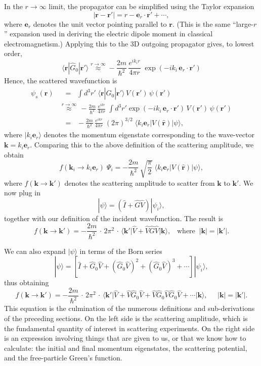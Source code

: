 \documentclass[pra,12pt]{revtex4}
\begin{document}
In the $r\rightarrow\infty$ limit, the propagator can be simplified
using the Taylor expansion
$$|\mathbf{r} - \mathbf{r}'| = r - \mathbf{e}_r \cdot \mathbf{r}' + \cdots,$$
where $\mathbf{e}_r$ denotes the unit vector pointing parallel to
$\mathbf{r}$.  (This is the same ``large-$r$'' expansion used in
deriving the electric dipole moment in classical electromagnetism.)
Applying this to the 3D outgoing propagator gives, to lowest order,
$$\langle\mathbf{r}|\hat{G}_0|\mathbf{r}'\rangle \overset{r\rightarrow\infty}{\approx} - \frac{2m}{\hbar^2}\, \frac{e^{ik_ir}}{4\pi r}\; \exp\left(-ik_i \,\mathbf{e}_r \cdot \mathbf{r}'\right)$$
Hence, the scattered wavefunction is
$$\begin{aligned}\psi_s(\mathbf{r}) &\;\;= \;\; \int d^3r'\; \langle\mathbf{r}|\hat{G}_0|\mathbf{r}'\rangle\, V(\mathbf{r}')\, \psi(\mathbf{r}') \\ &\overset{r\rightarrow\infty}{\approx} \, - \frac{2m}{\hbar^2} \, \frac{e^{ikr}}{4\pi r}\; \int d^3r' \exp\left(-ik_i \,\mathbf{e}_r \cdot \mathbf{r}'\right)\, V(\mathbf{r}')\, \psi(\mathbf{r}') \\ &\;\;=\;\; - \frac{2m}{\hbar^2} \, \frac{e^{ikr}}{4\pi r} \; (2\pi)^{3/2} \; \big\langle k_i \mathbf{e}_r \big|V(\hat{\mathbf{r}})\big|\psi\big\rangle, \end{aligned}$$
where $|k_i\mathbf{e}_r \rangle$ denotes the momentum eigenstate
corresponding to the wave-vector $\mathbf{k} = k_i\mathbf{e}_r$.
Comparing this to the above definition of the scattering amplitude, we
obtain
$$f(\mathbf{k}_i\rightarrow k_i\mathbf{e}_r )\; \Psi_i = - \frac{2m}{\hbar^2} \,\sqrt{\frac{\pi}{2}} \; \big\langle k_i \mathbf{e}_r \big|V(\hat{\mathbf{r}})\big|\psi\big\rangle,$$
where $f(\mathbf{k}\rightarrow \mathbf{k}')$ denotes the scattering
amplitude to scatter from $\mathbf{k}$ to $\mathbf{k}'$.  We now
plug in
$$|\psi\rangle = \left(\hat{I} + \hat{G}\hat{V}\right)|\psi_i\rangle,$$
together with our definition of the incident wavefunction.  The result
is
$$f(\mathbf{k}\rightarrow \mathbf{k}') = - \frac{2m}{\hbar^2} \,\cdot \, 2\pi^2 \,\cdot\, \big\langle \mathbf{k}'\big| \hat{V} + \hat{V}\hat{G} \hat{V} \big|\mathbf{k}\big\rangle, \;\;\;\mathrm{where} \;\; |\mathbf{k}| = |\mathbf{k}'|.$$

We can also expand $|\psi\rangle$ in terms of the Born series
$$|\psi\rangle = \left[\hat{I} + \hat{G}_0 \hat{V} + (\hat{G}_0 \hat{V})^2 + (\hat{G}_0 \hat{V})^3 + \cdots\right]|\psi_i\rangle,$$
thus obtaining
$$\boxed{\;\;\;f(\mathbf{k}\rightarrow \mathbf{k}') = - \frac{2m}{\hbar^2} \,\cdot \, 2\pi^2 \,\cdot\, \big\langle \mathbf{k}'\big| \hat{V} + \hat{V}\hat{G}_0 \hat{V} + \hat{V} \hat{G}_0 \hat{V} \hat{G}_0\hat{V} + \cdots \big|\mathbf{k}\big\rangle, \;\;\; \;\; |\mathbf{k}| = |\mathbf{k}'|.\;\;\;}$$
This equation is the culmination of the numerous definitions and
sub-derivations of the preceding sections.  On the left side is the
scattering amplitude, which is the fundamental quantity of interest in
scattering experiments.  On the right side is an expression involving
things that are given to us, or that we know how to calculate: the
initial and final momentum eigenstates, the scattering potential, and
the free-particle Green's function.
\end{document}
